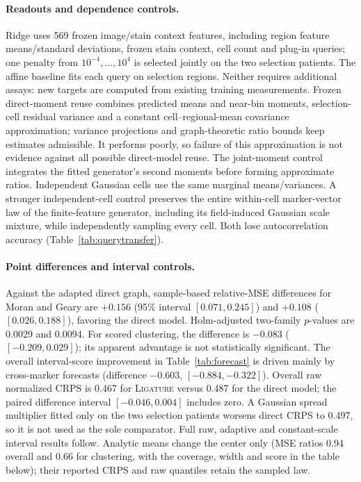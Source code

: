 \documentclass[10pt,letterpaper]{article}
\theoremstyle{definition}
\theoremstyle{remark}
\newcommand{\method}{\textnormal{\textsc{Ligature}}}
\begin{document}
\paragraph{Readouts and dependence controls.} Ridge uses 569 frozen image/stain context features, including region feature means/standard deviations, frozen stain context, cell count and plug-in queries; one penalty from $10^{-4},\ldots,10^4$ is selected jointly on the two selection patients. The affine baseline fits each query on selection regions. Neither requires additional assays: new targets are computed from existing training measurements. Frozen direct-moment reuse combines predicted means and near-bin moments, selection-cell residual variance and a constant cell--regional-mean covariance approximation; variance projections and graph-theoretic ratio bounds keep estimates admissible. It performs poorly, so failure of this approximation is not evidence against all possible direct-model reuse. The joint-moment control integrates the fitted generator's second moments before forming approximate ratios. Independent Gaussian cells use the same marginal means/variances. A stronger independent-cell control preserves the entire within-cell marker-vector law of the finite-feature generator, including its field-induced Gaussian scale mixture, while independently sampling every cell. Both lose autocorrelation accuracy (Table~\ref{tab:querytransfer}).

\paragraph{Point differences and interval controls.} Against the adapted direct graph, sample-based relative-MSE differences for Moran and Geary are $+0.156$ (95\% interval $[0.071,0.245]$) and $+0.108$ ($[0.026,0.188]$), favoring the direct model. Holm-adjusted two-family $p$-values are 0.0029 and 0.0094. For scored clustering, the difference is $-0.083$ ($[-0.209,0.029]$); its apparent advantage is not statistically significant. The overall interval-score improvement in Table~\ref{tab:forecast} is driven mainly by cross-marker forecasts (difference $-0.603$, $[-0.884,-0.322]$). Overall raw normalized CRPS is 0.467 for \method{} versus 0.487 for the direct model; the paired difference interval $[-0.046,0.004]$ includes zero. A Gaussian spread multiplier fitted only on the two selection patients worsens direct CRPS to 0.497, so it is not used as the sole comparator. Full raw, adaptive and constant-scale interval results follow. Analytic means change the center only (MSE ratios 0.94 overall and 0.66 for clustering, with the coverage, width and score in the table below); their reported CRPS and raw quantiles retain the sampled law.
\end{document}
